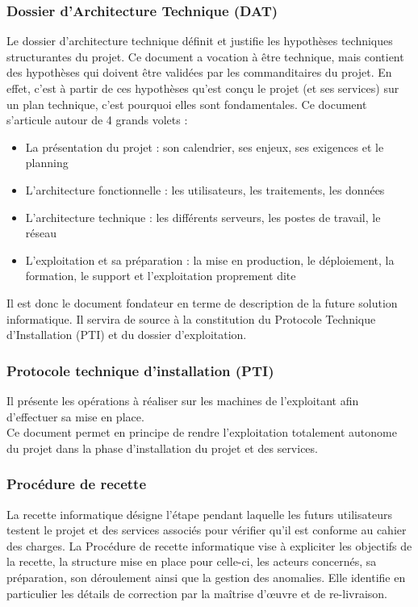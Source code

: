 \subsubsection{Dossier d'Architecture Technique (DAT)}
Le dossier d'architecture technique définit et justifie les hypothèses techniques structurantes du projet. Ce document a vocation à être technique, mais contient des hypothèses qui doivent être validées par les commanditaires du projet. En effet, c'est à partir de ces hypothèses qu'est conçu le projet (et ses services) sur un plan technique, c'est pourquoi elles sont fondamentales.
Ce document s'articule autour de 4 grands volets :
\begin{itemize}[label=\textbullet]
 \item La présentation du projet : son calendrier, ses enjeux, ses exigences et le planning
 \item L'architecture fonctionnelle : les utilisateurs, les traitements, les données 
 \item L'architecture technique : les différents serveurs, les postes de travail, le réseau
 \item L'exploitation et sa préparation : la mise en production, le déploiement, la formation, le support et l'exploitation proprement dite
\end{itemize}
Il est donc le document fondateur en terme de description de la future solution informatique. Il servira de source à la constitution du Protocole Technique d'Installation (PTI) et du dossier d'exploitation.

\subsubsection{Protocole technique d'installation (PTI)}
Il présente les opérations à réaliser sur les machines de l'exploitant afin d'effectuer sa mise en place.
\\
Ce document permet en principe de rendre l'exploitation totalement autonome du projet dans la phase d'installation du projet et des services.

\subsubsection{Procédure de recette}
La recette informatique désigne l'étape pendant laquelle les futurs utilisateurs testent le projet et des services associés pour vérifier qu'il est conforme au cahier des charges.
La Procédure de recette informatique vise à expliciter les objectifs de la recette, la structure mise en place pour celle-ci, les acteurs concernés, sa préparation, son déroulement ainsi que la gestion des anomalies. Elle identifie en particulier les détails de correction par la maîtrise d'œuvre et de re-livraison.

